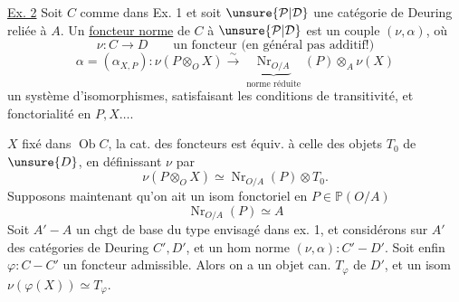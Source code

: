 \uline{Ex. 2} Soit $C$ comme dans Ex. 1 et soit $\unsure{\mathcal P|\mathcal D}$ une catégorie de Deuring reliée à $A$. Un \uline{foncteur norme} de $C$ à $\unsure{\mathcal P|\mathcal D}$ est un couple $(\nu,\alpha)$, où
\[
\nu:C\longrightarrow D\qquad\text{un foncteur (en général pas additif!)}
\]
\[
\alpha=(\alpha_{X,P}):\nu(P\otimes_O X)\xrightarrow{\sim}
\underbrace{\operatorname{Nr}_{O/A}}_{\text{norme réduite}}(P)\otimes_A\nu(X)
\]
un système d'isomorphismes, satisfaisant les conditions de transitivité, et fonctorialité en $P,X\ldots$.


  $X$ fixé dans $\operatorname{Ob}C$, la cat. des foncteurs  est  équiv.  à celle des objets $T_0$ de $\unsure{D}$, en définissant $\nu$ par
\[
\nu(P\otimes_O X)\simeq\operatorname{Nr}_{O/A}(P)\otimes T_0.
\]
Supposons maintenant qu'on ait un isom fonctoriel en $P\in\mathbb P(O/A)$
\[
\operatorname{Nr}_{O/A}(P)\simeq A
\]
Soit $A'\mathbin{-}A$ un chgt de base du type envisagé dans ex. 1, et considérons  sur $A'$ des catégories de Deuring $C',D'$, et un hom norme $(\nu,\alpha):C'\mathbin{-}D'$. Soit enfin $\varphi:C\mathbin{-}C'$ un foncteur admissible.
Alors  on a un objet can. $T_\varphi$ de $D'$, et un isom $\nu(\varphi(X))\simeq T_\varphi$.
